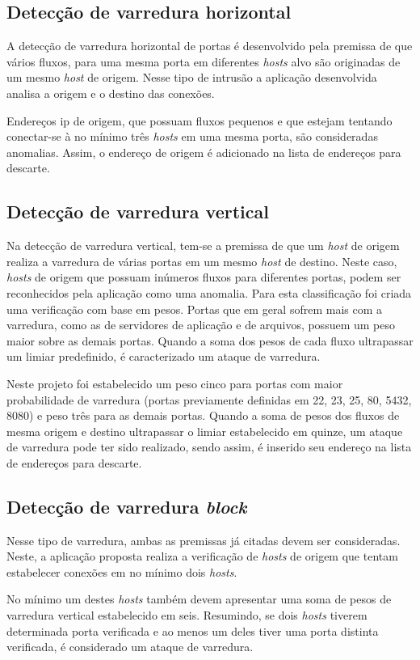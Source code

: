 \subsection{Detecção de varredura horizontal}

A detecção de varredura horizontal de portas é desenvolvido pela premissa de que vários fluxos, para uma mesma porta em diferentes \textit{hosts} alvo são originadas de um mesmo \textit{host} de origem. Nesse tipo de intrusão a aplicação desenvolvida analisa a origem e o destino das conexões. 

Endereços \gls{ip} de origem, que possuam fluxos pequenos e que estejam tentando conectar-se à no mínimo três \textit{hosts} em uma mesma porta, são consideradas anomalias. Assim, o endereço de origem é adicionado na lista de endereços para descarte.

\subsection{Detecção de varredura vertical}

Na detecção de varredura vertical, tem-se a premissa de que um \textit{host} de origem realiza a varredura de várias portas em um mesmo \textit{host} de destino. Neste caso, \textit{hosts} de origem que possuam inúmeros fluxos para diferentes portas, podem ser reconhecidos pela aplicação como uma anomalia. Para esta classificação foi criada uma verificação com base em pesos. Portas que em geral sofrem mais com a varredura, como as de servidores de aplicação e de arquivos, possuem um peso maior sobre as demais portas. Quando a soma dos pesos de cada fluxo ultrapassar um limiar predefinido, é caracterizado um ataque de varredura. 

Neste projeto foi estabelecido um peso cinco para portas com maior probabilidade de varredura (portas previamente definidas em 22, 23, 25, 80, 5432, 8080) e peso três para as demais portas. Quando a soma de pesos dos fluxos de mesma origem e destino ultrapassar o limiar estabelecido em quinze, um ataque de varredura pode ter sido realizado, sendo assim, é inserido seu endereço na lista de endereços para descarte.

\subsection{Detecção de varredura \textit{block}}

Nesse tipo de varredura, ambas as premissas já citadas devem ser consideradas. Neste, a aplicação proposta realiza a verificação de \textit{hosts} de origem que tentam estabelecer conexões em no mínimo dois \textit{hosts}. 

No mínimo um destes \textit{hosts} também devem apresentar uma soma de pesos de varredura vertical estabelecido em seis. Resumindo, se dois \textit{hosts} tiverem determinada porta verificada e ao menos um deles tiver uma porta distinta verificada, é considerado um ataque de varredura.



